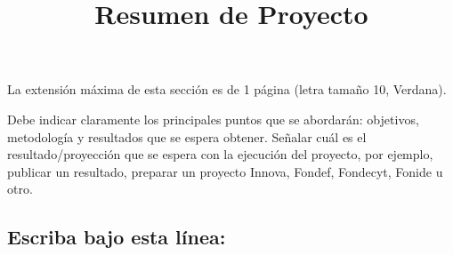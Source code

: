 \documentclass[10pt,prl]{revtex4}
\begin{document}
\title{ Resumen de Proyecto}
\maketitle

La extensi\'on m\'axima de esta secci\'on es de 1 p\'agina (letra tama\~no 10,  Verdana).

Debe indicar claramente los principales puntos que se abordar\'an: objetivos, metodolog\'ia y resultados que se espera obtener. Se\~nalar cu\'al es el resultado/proyecci\'on que se espera con la ejecuci\'on del proyecto, por ejemplo, publicar un resultado, preparar un proyecto Innova, Fondef, Fondecyt, Fonide u otro.

\maketitle
\subsection{Escriba bajo esta l\'inea:}
\end{document}
